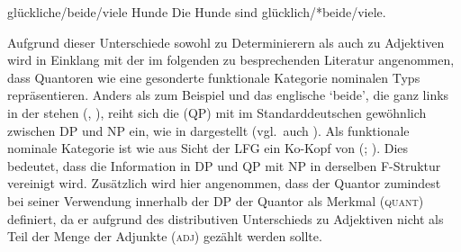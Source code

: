 \begin{exe}
\label{ex:beidedet}
\ex \begin{xlist}
		\label{ex:beidedet_1}
		\label{ex:beidedet_2}
		\label{ex:beidedet_3}
		\label{ex:beidedet_4}
\end{xlist}

\ex \begin{xlist}
	\ex glückliche/beide/viele Hunde
		\label{ex:beidepred_1}
	\ex Die Hunde sind glücklich/*beide/viele.
		\label{ex:beidepred_2}
\end{xlist}
\end{exe}

Aufgrund dieser Unterschiede sowohl zu 
Determinierern als auch zu Adjektiven
wird in Einklang mit der im folgenden zu besprechenden Literatur angenommen,
dass Quantoren wie  eine gesonderte funktionale Kategorie 
nominalen Typs repräsentieren. Anders als zum Beispiel  und das
englische  `beide', die ganz links in der
 stehen (, ), reiht
sich die  (QP) mit  im Standarddeutschen
gewöhnlich zwischen DP und NP ein,
wie in  dargestellt (vgl.~auch \cite[44--45 mit Fußnote
30]{lyons1999}). Als funktionale nominale Kategorie ist  wie 
aus Sicht der LFG ein Ko-Kopf von
 (; \cite[124]{bresnanetal2016}). Dies bedeutet, dass die
Information in DP und QP mit NP in derselben F-Struktur vereinigt wird. Zusätzlich wird hier angenommen, dass der Quantor
zumindest bei seiner Verwendung innerhalb der DP der Quantor als
Merkmal (\textsc{quant})
definiert, da er aufgrund des distributiven Unterschieds zu Adjektiven nicht
als Teil der Menge der Adjunkte (\textsc{adj}) gezählt werden
sollte.

